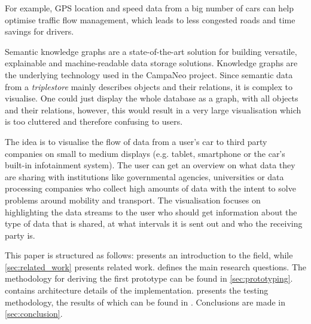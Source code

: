 \documentclass[../paper.tex]{subfiles}
\begin{document}
  For example, GPS location and speed data from a big number of cars can help
  optimise traffic flow management, which leads to less congested roads and
  time savings for drivers.

  Semantic knowledge graphs are a state-of-the-art solution for building
  versatile, explainable and machine-readable data storage solutions. Knowledge
  graphs are the underlying technology used in the CampaNeo project. Since
  semantic data from a \textit{triplestore} mainly describes objects and their
  relations, it is complex to visualise. One could just display the whole
  database as a graph, with all objects and their relations, however, this
  would result in a very large visualisation which is too cluttered and
  therefore confusing to users. %

  The idea is to visualise the flow of data from a user’s car to third party
  companies on small to medium displays (e.g. tablet, smartphone or the car’s
  built-in infotainment system). The user can get an overview on what data they
  are sharing with institutions like governmental agencies, universities or
  data processing companies who collect high amounts of data with the intent to
  solve problems around mobility and transport. The visualisation
  focuses on highlighting the data streams to the user who should get
  information about the type of data that is shared, at what intervals it is
  sent out and who the receiving party is.

  This paper is structured as follows:  presents an
  introduction to the field, while \cref{sec:related_work} presents related
  work.  defines the main research questions. The
  methodology for deriving the first prototype can be found in 
  \cref{sec:prototyping}.  contains architecture
  details of the implementation.  presents the 
  testing methodology, the results of which can be found in .
  Conclusions are made in \cref{sec:conclusion}.
\end{document}
